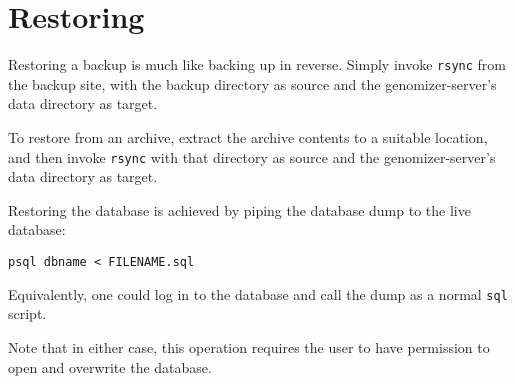 \section{Restoring}

Restoring a backup is much like backing up in reverse. Simply invoke
\texttt{rsync} from the backup site, with the backup directory as
source and the genomizer-server's data directory as target.

To restore from an archive, extract the archive contents to a suitable
location, and then invoke \texttt{rsync} with that directory as source
and the genomizer-server's data directory as target.


Restoring the database is achieved by piping the database dump to
the live database: 
\begin{verbatim}
psql dbname < FILENAME.sql
\end{verbatim}

Equivalently, one could log in to the database and call the dump as a
normal \texttt{sql} script.

Note that in either case, this operation requires the user to have
permission to open and overwrite the database.

